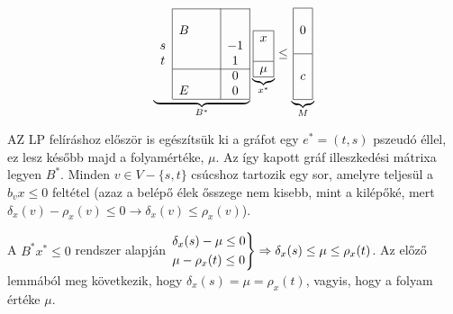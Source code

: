 \begin{wrapfigure}{L}{0.35\textwidth}
  \begin{center}
    \vspace{-1.3cm}
\begin{displaymath}
\underbrace{
\begin{array}{c|ccc|c|}
\cline{2-5}
   &   & & & \\
   &  B& & & \\
 s &   & & &-1 \\
 t &   & & & 1 \\ 
 \cline{2-5}
   &   & & & 0 \\
   & E & & & 0 \\
\cline{2-5}
\end{array}}_{B^*}
\underbrace{
\begin{array}{|c|}
\hline
x\\
\\
\hline
\mu\\
\hline
\end{array}}_{x^*}
\leq
\underbrace{
\begin{array}{|c|}
\hline
\\
0\\
\\
\hline
\\
c\\
\\
\hline
\end{array}}_{M}
\end{displaymath}
  \vspace{-1.3cm}
  \end{center}
\end{wrapfigure}

AZ LP felíráshoz először is egészítsük ki a gráfot egy $e^*=(t,s)$ pszeudó éllel, ez lesz 
később majd a folyamértéke, $\mu$. Az így kapott gráf illeszkedési mátrixa legyen $B^*$.
Minden $v \in V - \{s,t\}$ csúcshoz tartozik egy sor, amelyre teljesül a $b_vx\leq 0$ feltétel 
(azaz a belépő élek ősszege nem kisebb, mint a kilépőké, mert $\delta_x(v) - \rho_x(v) \leq 
0 \rightarrow \delta_x(v) \leq \rho_x(v)$). 

A $B^*x^* \leq 0$ rendszer alapján $\begin{rcases} \delta_x(s)-\mu \leq 0 \\
\mu - \rho_x(t) \leq 0 \end{rcases} \Rightarrow \delta_x(s) \leq \mu \leq
\rho_x(t)$. Az előző lemmából meg következik, hogy $\delta_x(s)=\mu=\rho_x(t)$, 
vagyis, hogy a folyam értéke $\mu$. 

